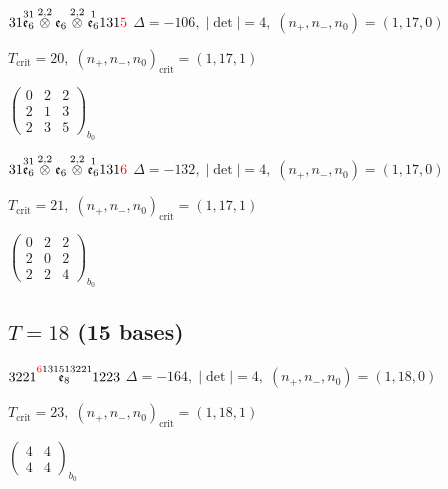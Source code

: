 \documentclass[10pt]{article}
\begin{document}
\smallskip

$31\overset{31}{\mathfrak{e}_6}\overset{2,2}{\otimes}\mathfrak{e}_6\overset{2,2}{\otimes}\overset{1}{\mathfrak{e}_6}131\textcolor{red}{5}$ \quad $\Delta=-106,\; |\det|=4,\; (n_+,n_-,n_0)=(1,17,0)$

\hspace{1em}$T_{\text{crit}}=20,\; (n_+,n_-,n_0)_{\text{crit}}=(1,17,1)$

\hspace{2em}$\left(\begin{smallmatrix}0 & 2 & 2 \\ 2 & 1 & 3 \\ 2 & 3 & 5\end{smallmatrix}\right)_{\!b_0}$

$31\overset{31}{\mathfrak{e}_6}\overset{2,2}{\otimes}\mathfrak{e}_6\overset{2,2}{\otimes}\overset{1}{\mathfrak{e}_6}131\textcolor{red}{6}$ \quad $\Delta=-132,\; |\det|=4,\; (n_+,n_-,n_0)=(1,17,0)$

\hspace{1em}$T_{\text{crit}}=21,\; (n_+,n_-,n_0)_{\text{crit}}=(1,17,1)$

\hspace{2em}$\left(\begin{smallmatrix}0 & 2 & 2 \\ 2 & 0 & 2 \\ 2 & 2 & 4\end{smallmatrix}\right)_{\!b_0}$


\subsection*{$T = 18$ \quad (15 bases)}
\smallskip

$3221\overset{\textcolor{red}{6}131513221}{\mathfrak{e}_8}1223$ \quad $\Delta=-164,\; |\det|=4,\; (n_+,n_-,n_0)=(1,18,0)$

\hspace{1em}$T_{\text{crit}}=23,\; (n_+,n_-,n_0)_{\text{crit}}=(1,18,1)$

\hspace{2em}$\left(\begin{smallmatrix}4 & 4 \\ 4 & 4\end{smallmatrix}\right)_{\!b_0}$
\end{document}
